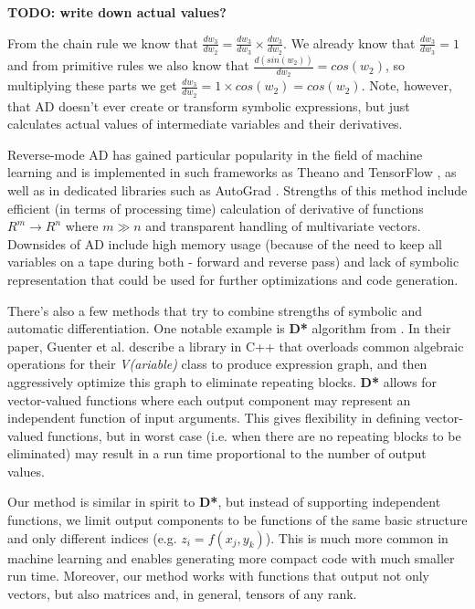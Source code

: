 \documentclass[conference]{IEEEtran}
\begin{document}
\textbf{TODO: write down actual values?}

From the chain rule we know that
$\frac{dw_3}{dw_2} = \frac{dw_3}{dw_3} \times \frac{dw_3}{dw_2}$. We
already know that $\frac{dw_3}{dw_3} = 1$ and from primitive rules we
also know that $\frac{d(sin(w_2))}{dw_2} = cos(w_2)$, so multiplying
these parts we get $\frac{dw_3}{dw_2} = 1 \times cos(w_2) = cos(w_2)$.
Note, however, that AD doesn't ever create or transform symbolic
expressions, but just calculates actual values of intermediate
variables and their derivatives.

Reverse-mode AD has gained particular popularity in the field of
machine learning and is implemented in such frameworks as Theano
\cite{Theano} and TensorFlow \cite{TensorFlow}, as well as in
dedicated libraries such as AutoGrad \cite{AutoGrad}. Strengths of
this method include efficient (in terms of processing time)
calculation of derivative of functions $R^m \to R^n$ where $m \gg n$
and transparent handling of multivariate vectors. Downsides of AD
include high memory usage (because of the need to keep all variables
on a tape during both - forward and reverse pass) and lack of symbolic
representation that could be used for further optimizations and code
generation.

There's also a few methods that try to combine strengths of symbolic
and automatic differentiation. One notable example is \textbf{D*}
algorithm from \cite{guenter2007}. In their paper, Guenter et
al. describe a library in C++ that overloads common algebraic
operations for their \textit{V(ariable)} class to produce expression
graph, and then aggressively optimize this graph to eliminate
repeating blocks. \textbf{D*} allows for vector-valued functions where
each output component may represent an independent function of input
arguments. This gives flexibility in defining vector-valued functions,
but in worst case (i.e. when there are no repeating blocks to be
eliminated) may result in a run time proportional to the number of
output values.

Our method is similar in spirit to \textbf{D*}, but instead of
supporting independent functions, we limit output components to be
functions of the same basic structure and only different indices
(e.g. $z_i = f(x_j, y_k)$). This is much more common in machine
learning and enables generating more compact code with much smaller
run time. Moreover, our method works with functions that output not
only vectors, but also matrices and, in general, tensors of any rank.
\end{document}
